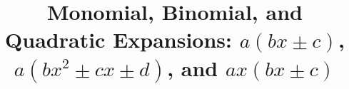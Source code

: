 \documentclass[12pt, a4paper, addpoints]{exam}
\date{}
\title{Monomial, Binomial, and Quadratic Expansions: \(a(bx\pm c)\), \(a(bx^2 \pm cx \pm d)\), and \(ax(bx\pm c)\)}
\begin{document}
\vspace{-22mm}
\maketitle

\begin{questions}
\Large
\question   


\end{questions}
\end{document}
